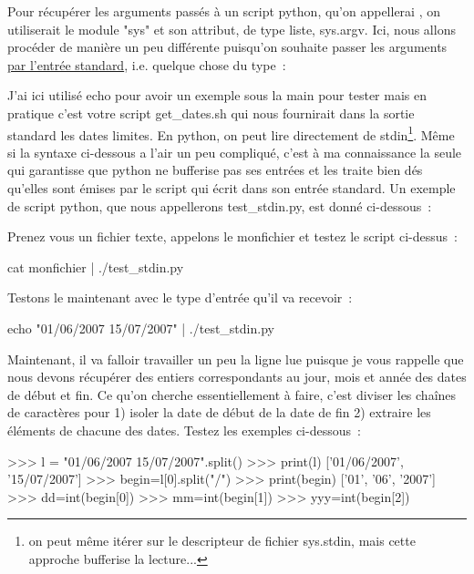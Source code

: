 Pour récupérer les arguments passés à un script python, qu'on appellerai , on utiliserait le module "sys" et son attribut, de type liste, sys.argv. Ici, nous allons procéder de manière un peu différente puisqu'on souhaite passer les arguments \underline{par l'entrée standard}, i.e. quelque chose du type~:
\begin{center}
\end{center}
J'ai ici utilisé echo pour avoir un exemple sous la main pour tester mais en pratique c'est votre script get\_dates.sh qui nous fournirait dans la sortie standard les dates limites. En python, on peut lire directement de stdin\footnote{on peut même itérer sur le descripteur de fichier sys.stdin, mais cette approche bufferise la lecture...}. Même si la syntaxe ci-dessous a l'air un peu compliqué, c'est à ma connaissance la seule qui garantisse que python ne bufferise pas ses entrées et les traite bien dés qu'elles sont émises par le script qui écrit dans son entrée standard. Un exemple de script python, que nous appellerons test\_stdin.py, est donné ci-dessous~:\\

\cprotect{}

Prenez vous un fichier texte, appelons le monfichier et testez le script ci-dessus~:
\begin{center}
cat monfichier | ./test\_stdin.py
\end{center}

Testons le maintenant avec le type d'entrée qu'il va recevoir~:
\begin{center}
echo "01/06/2007 15/07/2007" | ./test\_stdin.py
\end{center}

Maintenant, il va falloir travailler un peu la ligne lue puisque je vous rappelle que nous devons récupérer des entiers correspondants au jour, mois et année des dates de début et fin. Ce qu'on cherche essentiellement à faire, c'est diviser les chaînes de caractères pour 1) isoler la date de début de la date de fin 2) extraire les éléments de chacune des dates. Testez les exemples ci-dessous~:
\begin{exempleResultat}
>>> l = "01/06/2007 15/07/2007".split()
>>> print(l)
['01/06/2007', '15/07/2007']
>>> begin=l[0].split("/")
>>> print(begin)
['01', '06', '2007']
>>> dd=int(begin[0])
>>> mm=int(begin[1])
>>> yyy=int(begin[2])
\end{exempleResultat}

